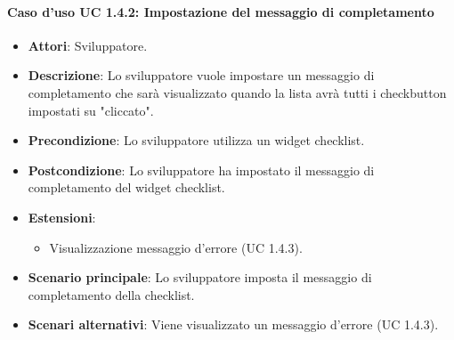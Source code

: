 \paragraph{Caso d'uso UC 1.4.2: Impostazione del messaggio di completamento}

\FloatBarrier
\begin{itemize}
\item\textbf{Attori}: Sviluppatore.
\item\textbf{Descrizione}: Lo sviluppatore vuole impostare un messaggio di completamento che sarà visualizzato quando la lista avrà tutti i checkbutton impostati su "cliccato".
\item\textbf{Precondizione}: Lo sviluppatore utilizza un widget checklist.
\item\textbf{Postcondizione}: Lo sviluppatore ha impostato il messaggio di completamento del widget checklist.
\item\textbf{Estensioni}: 
\begin{itemize}
\item Visualizzazione messaggio d'errore (UC 1.4.3).
\end{itemize}
\item\textbf{Scenario principale}: Lo sviluppatore imposta il messaggio di completamento della checklist.
\item\textbf{Scenari alternativi}: Viene visualizzato un messaggio d'errore (UC 1.4.3).
\end{itemize}
